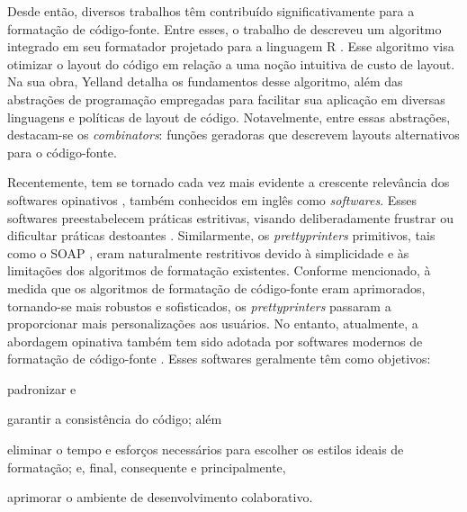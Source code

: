 \documentclass
  [11pt,a4paper,english,brazil,openright,sumario=tradicional,twoside]
  {abntex2}
\begin{document}
  Desde então, diversos trabalhos têm contribuído significativamente para a
  formatação de código-fonte. Entre esses, o trabalho de
  \textcite{yelland-2015-new} descreveu um algoritmo integrado em seu
  formatador projetado para a linguagem R \cite{yelland-2015-rfmt}. Esse
  algoritmo visa otimizar o layout do código em relação a uma noção intuitiva
  de custo de layout. Na sua obra, Yelland detalha os fundamentos desse
  algoritmo, além das abstrações de programação empregadas para facilitar sua
  aplicação em diversas linguagens e políticas de layout de código.
  Notavelmente, entre essas abstrações, destacam-se os \textit{combinators}:
  funções geradoras que descrevem layouts alternativos para o código-fonte.

  Recentemente, tem se tornado cada vez mais evidente a crescente relevância
  dos softwares opinativos \cite{eccles-2015-rise}, também conhecidos em inglês
  como \textit{ softwares}. Esses softwares preestabelecem
  práticas estritivas, visando deliberadamente frustrar ou dificultar práticas
  destoantes \cite{lance-2021-about}. Similarmente, os \textit{prettyprinters}
  primitivos, tais como o SOAP \cite{scowen-1971-soap}, eram naturalmente
  restritivos devido à simplicidade e às limitações dos algoritmos de
  formatação existentes. Conforme mencionado, à medida que os algoritmos de
  formatação de código-fonte eram aprimorados, tornando-se mais robustos e
  sofisticados, os \textit{prettyprinters} passaram a proporcionar mais
  personalizações aos usuários. No entanto, atualmente, a abordagem opinativa
  também tem sido adotada por softwares modernos de formatação de código-fonte
  \cites{black-2023-black}[5--6,8]{griesemer-2022-cultural}. Esses softwares
  geralmente têm como objetivos:
  \begin{inparaenum}
    \item padronizar e
    \item garantir a consistência do código; além
    \item eliminar o tempo e esforços necessários para escolher os estilos
          ideais de formatação; e, final, consequente e principalmente,
    \item aprimorar o ambiente de desenvolvimento colaborativo.
  \end{inparaenum}
\end{document}
